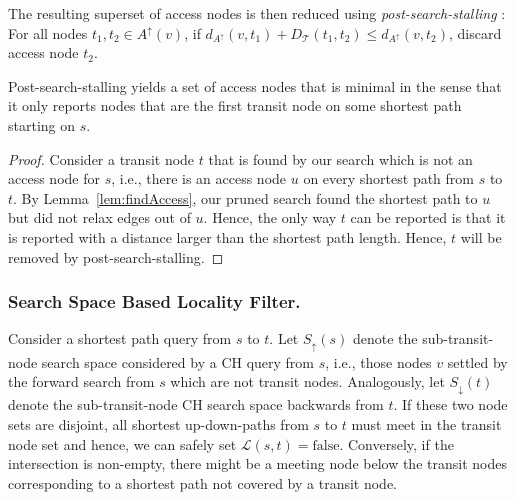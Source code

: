 \documentclass{llncs}
\begin{document}
The resulting superset of access nodes is then reduced using \emph{post-search-stalling} \cite{s-rprn-08}:
For all nodes $t_1,t_2 \in A^\uparrow(v)$, if $d_{A^\uparrow}(v,t_1)+D_\mathcal{T}(t_1,t_2)\leq d_{A^\uparrow}(v,t_2)$, discard access node $t_2$.

\begin{lemma}\label{lem:minimality}
Post-search-stalling yields a set of access nodes that is minimal in the sense that it only reports nodes that are the first transit node on some shortest path starting on $s$.
\begin{proof}
Consider a transit node $t$ that is found by our search which is not an access node for $s$, i.e., there is an access node $u$ on every shortest path from $s$ to $t$. 
By Lemma~\ref{lem:findAccess}, our pruned search found the shortest path to $u$ but did not relax edges out of $u$.
Hence, the only way $t$ can be reported is that it is reported with a distance larger than the shortest path length.
Hence, $t$ will be removed by post-search-stalling.
\end{proof}
\end{lemma}

\subsubsection{Search Space Based Locality Filter.}
Consider a shortest path query from $s$ to $t$.  Let $S_{\uparrow}(s)$ denote the sub-transit-node search space considered by a CH query from $s$, i.e., those nodes $v$ settled by the forward search from $s$ which are not transit nodes. Analogously, let $S_{\downarrow}(t)$ denote the sub-transit-node CH search space backwards from $t$. If these two node sets are disjoint, all shortest up-down-paths from $s$ to $t$ must meet in the transit node set and hence, we can safely set $\mathcal{L}(s,t)=\text{false}$. Conversely, if the intersection is non-empty, there might be a meeting node below the transit nodes corresponding to a shortest path not covered by a transit node. 
\end{document}
